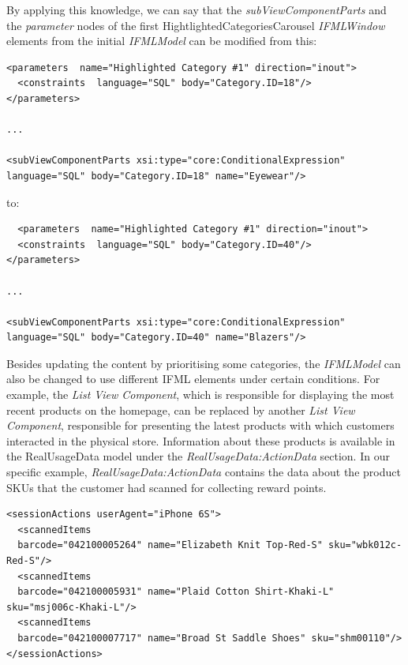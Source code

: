 By applying this knowledge, we can say that the \textit{subViewComponentParts} and the \textit{parameter} nodes of the first HightlightedCategoriesCarousel \textit{IFMLWindow} elements from the initial \textit{IFMLModel} can be modified from this:

\vspace{0.5cm}
\lstset{language=XML}
\begin{lstlisting} 
<parameters  name="Highlighted Category #1" direction="inout">
  <constraints  language="SQL" body="Category.ID=18"/>
</parameters>

...

<subViewComponentParts xsi:type="core:ConditionalExpression"  language="SQL" body="Category.ID=18" name="Eyewear"/>
\end{lstlisting}
\vspace{0.5cm}

to:

\vspace{0.5cm}
\lstset{language=XML}
\begin{lstlisting} 
  <parameters  name="Highlighted Category #1" direction="inout">
  <constraints  language="SQL" body="Category.ID=40"/>
</parameters>

...

<subViewComponentParts xsi:type="core:ConditionalExpression"  language="SQL" body="Category.ID=40" name="Blazers"/>
\end{lstlisting}
\vspace{0.5cm}

Besides updating the content by prioritising some categories, the \textit{IFMLModel} can also be changed to use different IFML elements under certain conditions. For example, the \textit{List View Component}, which is responsible for displaying the most recent products on the homepage, can be replaced by another \textit{List View Component}, responsible for presenting the latest products with which customers interacted in the physical store. Information about these products is available in the RealUsageData model under the \textit{RealUsageData:ActionData} section. In our specific example, \textit{RealUsageData:ActionData} contains the data about the product SKUs that the customer had scanned for collecting reward points.

\vspace{0.5cm}
\lstset{language=XML}
\begin{lstlisting} 
<sessionActions userAgent="iPhone 6S">
  <scannedItems 
  barcode="042100005264" name="Elizabeth Knit Top-Red-S" sku="wbk012c-Red-S"/>
  <scannedItems 
  barcode="042100005931" name="Plaid Cotton Shirt-Khaki-L" sku="msj006c-Khaki-L"/>
  <scannedItems 
  barcode="042100007717" name="Broad St Saddle Shoes" sku="shm00110"/>
</sessionActions>
\end{lstlisting}
\vspace{0.5cm}


